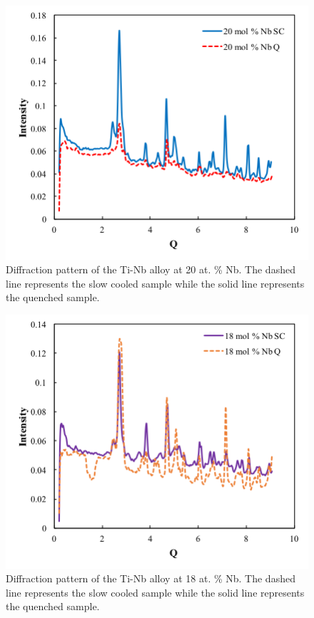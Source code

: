 \pagebreak
\begin{figure}[H]
	\centering
	\includegraphics[width=\textwidth]{Chapter-7/Figures/50diff20.png}
	\caption{Diffraction pattern of the Ti-Nb alloy at 20 at. \% Nb. The dashed line represents the slow cooled sample while the solid line represents the quenched sample.}
	\label{Ch7-figure:50diff20}
\end{figure}

\pagebreak
\begin{figure}[H]
	\centering
	\includegraphics[width=\textwidth]{Chapter-7/Figures/50diff18.png}
	\caption{Diffraction pattern of the Ti-Nb alloy at 18 at. \% Nb. The dashed line represents the slow cooled sample while the solid line represents the quenched sample.}
	\label{Ch7-figure:50diff18}
\end{figure}

